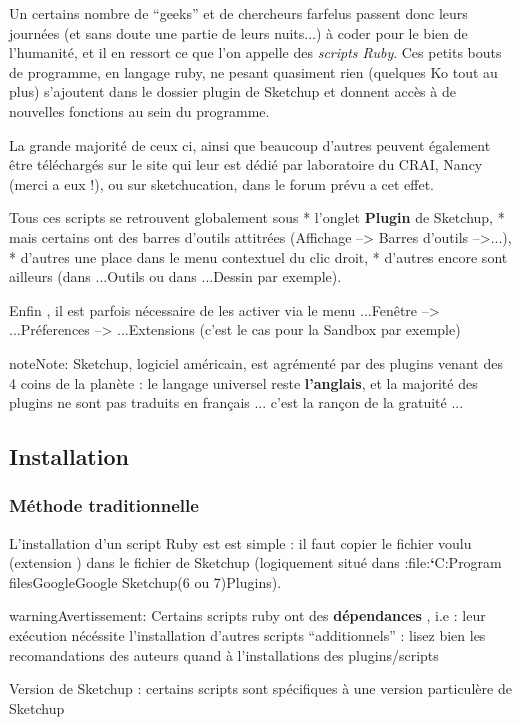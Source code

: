 \documentclass[a4paper,12pt,french]{sphinxmanual}
\begin{document}
Un certains nombre de ``geeks'' et de chercheurs farfelus passent donc leurs journées (et sans doute une partie de leurs nuits...) à coder pour le bien de l'humanité, et il en ressort ce que l'on appelle des \emph{scripts Ruby}. Ces petits bouts de programme, en langage ruby, ne pesant quasiment rien (quelques Ko tout au plus) s'ajoutent dans le dossier plugin de Sketchup et donnent accès à de nouvelles fonctions au sein du programme.

La grande majorité de ceux ci, ainsi que beaucoup d'autres peuvent également être téléchargés sur le site qui leur est dédié par laboratoire du CRAI, Nancy (merci  a eux !), ou sur sketchucation, dans le forum prévu a cet effet.

Tous ces scripts se retrouvent globalement sous
* l'onglet \textbf{Plugin} de Sketchup,
* mais certains ont des barres d'outils attitrées (Affichage --\textgreater{} Barres d'outils --\textgreater{}...),
* d'autres une place dans le menu contextuel du clic droit,
* d'autres encore sont ailleurs (dans ...Outils ou dans ...Dessin par exemple).

Enfin , il est parfois nécessaire de les activer via le menu ...Fenêtre --\textgreater{} ...Préferences --\textgreater{} ...Extensions (c'est le cas pour la Sandbox par exemple)

\begin{notice}{note}{Note:}
Sketchup, logiciel américain, est agrémenté par des plugins venant des 4 coins de la planète : le langage universel reste \textbf{l'anglais}, et la majorité des plugins ne sont pas traduits en français ... c'est la rançon de la gratuité ...
\end{notice}


\subsection{Installation}
\label{su/install-plugin-su:installation}

\subsubsection{Méthode traditionnelle}
\label{su/install-plugin-su:methode-traditionnelle}
L'installation d'un script Ruby est est simple : il faut copier le fichier voulu (extension ) dans le fichier  de Sketchup (logiquement situé dans :file:{\color{red}\bfseries{}{}`}C:Program filesGoogleGoogle Sketchup(6 ou 7)Plugins).

\begin{notice}{warning}{Avertissement:}
Certains scripts ruby ont des \textbf{dépendances} , i.e : leur exécution nécéssite l'installation d'autres scripts ``additionnels'' : lisez bien les recomandations des auteurs quand à l'installations des plugins/scripts

Version de Sketchup : certains scripts sont spécifiques à une version particulère de Sketchup
\end{notice}
\end{document}
